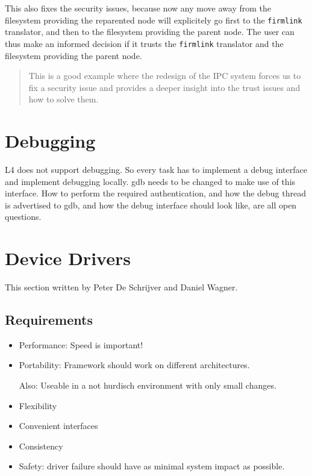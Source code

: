 \documentclass[9pt,a4paper]{extarticle}
\newenvironment{comment}{\footnotesize \begin{quote}}{\end{quote}}
\begin{document}
This also fixes the security issues, because now any move away from
the filesystem providing the reparented node will explicitely go first
to the \texttt{firmlink} translator, and then to the filesystem
providing the parent node.  The user can thus make an informed
decision if it trusts the \texttt{firmlink} translator and the
filesystem providing the parent node.

\begin{comment}
  This is a good example where the redesign of the IPC system forces
  us to fix a security issue and provides a deeper insight into the
  trust issues and how to solve them.
\end{comment}


\section{Debugging}
\label{debug}

L4 does not support debugging.  So every task has to implement a debug
interface and implement debugging locally.  gdb needs to be changed to
make use of this interface.  How to perform the required
authentication, and how the debug thread is advertised to gdb, and how
the debug interface should look like, are all open questions.


\section{Device Drivers}

This section written by Peter De Schrijver and Daniel Wagner.

\subsection{Requirements}

  \begin{itemize}
  \item Performance: Speed is important!
  \item Portability: Framework should work on different architectures.
    
    Also: Useable in a not hurdisch environment with only
    small changes.

  \item Flexibility
  \item Convenient interfaces
  \item Consistency 
  \item Safety: driver failure should have as minimal system impact as
    possible.
  \end{itemize}
\end{document}
